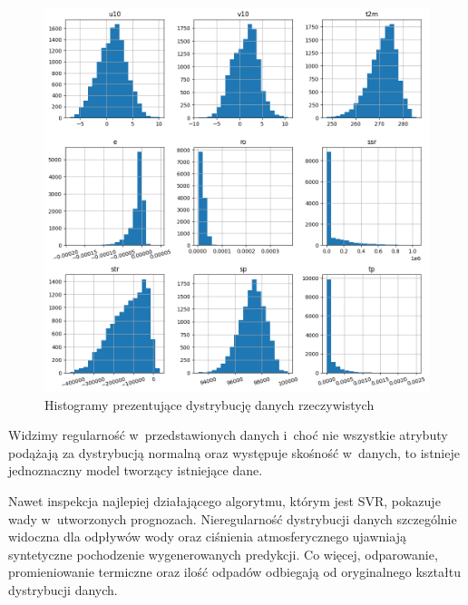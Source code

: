 \begin{figure}[H]
    \centering
    \includegraphics[width=\textwidth]{images/hist.png}
    \caption{Histogramy prezentujące dystrybucję danych rzeczywistych}
    \label{real-hist}
\end{figure}

Widzimy regularność w~przedstawionych danych i~choć nie wszystkie atrybuty podążają za dystrybucją normalną 
oraz występuje skośność w~danych, to istnieje jednoznaczny model tworzący istniejące dane.

Nawet inspekcja najlepiej działającego algorytmu, którym jest SVR, pokazuje wady w~utworzonych 
prognozach. Nieregularność dystrybucji danych szczególnie widoczna dla odpływów wody oraz
ciśnienia atmosferycznego ujawniają syntetyczne pochodzenie wygenerowanych predykcji. 
Co więcej, odparowanie, promieniowanie termiczne oraz ilość odpadów odbiegają od oryginalnego kształtu
dystrybucji danych.

